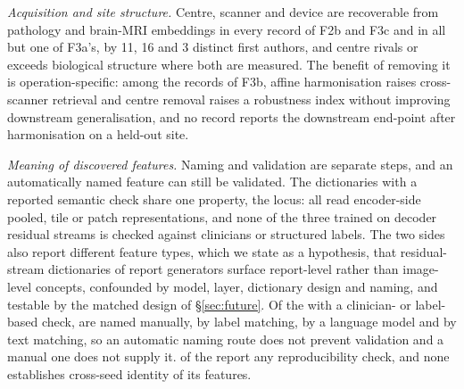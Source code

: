 \emph{Acquisition and site structure.} Centre, scanner and device are recoverable from pathology and
brain-MRI embeddings in every record of F2b and F3c and in all but one of F3a's, by 11, 16 and 3
distinct first authors, and centre rivals or exceeds biological structure where both are measured. The benefit of removing it is operation-specific: among the records of F3b, affine harmonisation raises cross-scanner retrieval
and centre removal raises a robustness index without improving downstream generalisation, and no record
reports the downstream end-point after harmonisation on a held-out site.

\emph{Meaning of discovered features.} Naming and validation are separate steps, and an automatically
named feature can still be validated. The \Nsaeval{} dictionaries with a reported semantic check share one property, the locus: all read encoder-side pooled, tile or patch representations, and none of the three
trained on decoder residual streams is checked against clinicians or structured labels. The two sides
also report different feature types, which we state as a hypothesis, that residual-stream dictionaries of report generators surface report-level rather than image-level concepts, confounded by model, layer,
dictionary design and naming, and testable by the matched design of \S\ref{sec:future}. Of the \Nsaeval{} with a
clinician- or label-based check, \Nsaemanual{} are named manually, \Nsaelabmatch{} by label matching,
\Nsaellm{} by a language model and \Nsaetext{} by text matching, so an automatic naming route does not
prevent validation and a manual one does not supply it. \Nsaestab{} of the \Nsae{} report any
reproducibility check, and none establishes cross-seed identity of its features.

